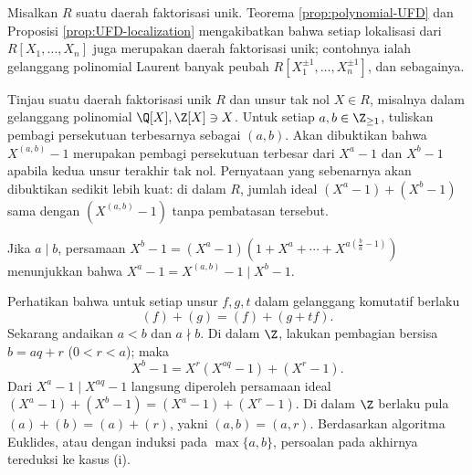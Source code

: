 \begin{example}
	Misalkan $R$ suatu daerah faktorisasi unik. Teorema \ref{prop:polynomial-UFD} dan Proposisi \ref{prop:UFD-localization} mengakibatkan bahwa setiap lokalisasi dari $R[X_1, \ldots, X_n]$ juga merupakan daerah faktorisasi unik; contohnya ialah gelanggang polinomial Laurent banyak peubah $R[X_1^{\pm 1}, \ldots, X_n^{\pm 1}]$, dan sebagainya.
\end{example}

\begin{example}\label{eg:gcd-cyclotomic}
	Tinjau suatu daerah faktorisasi unik $R$ dan unsur tak nol $X \in R$, misalnya dalam gelanggang polinomial $\Q[X], \Z[X] \ni X$. Untuk setiap $a, b \in \Z_{\geq 1}$, tuliskan pembagi persekutuan terbesarnya sebagai $(a,b)$. Akan dibuktikan bahwa $X^{(a,b)} - 1$ merupakan pembagi persekutuan terbesar dari $X^a - 1$ dan $X^b - 1$ apabila kedua unsur terakhir tak nol. Pernyataan yang sebenarnya akan dibuktikan sedikit lebih kuat: di dalam $R$, jumlah ideal $(X^a - 1) + (X^b - 1)$ sama dengan $\left( X^{(a,b)} - 1 \right)$ tanpa pembatasan tersebut.
	\begin{compactenum}[(i)]
		\item Jika $a \mid b$, persamaan $X^b - 1 = (X^a -1)(1 + X^a + \cdots + X^{a(\frac{b}{a} - 1)})$ menunjukkan bahwa $X^a - 1 = X^{(a,b)} - 1 \mid X^b - 1$.
		\item Perhatikan bahwa untuk setiap unsur $f, g, t$ dalam gelanggang komutatif berlaku
			\[ (f) + (g) = (f) + (g+tf). \]
			Sekarang andaikan $a < b$ dan $a \nmid b$. Di dalam $\Z$, lakukan pembagian bersisa $b = aq + r$ ($0 < r < a$); maka
			\[ X^b - 1 = X^r(X^{aq}-1) + (X^r - 1). \]
			Dari $X^a - 1 \mid X^{aq} - 1$ langsung diperoleh persamaan ideal $(X^a - 1) + (X^b - 1) = (X^a - 1) + (X^r - 1)$. Di dalam $\Z$ berlaku pula $(a) + (b) = (a) + (r)$, yakni $(a,b)=(a,r)$. Berdasarkan algoritma Euklides, atau dengan induksi pada $\max\{a,b\}$, persoalan pada akhirnya tereduksi ke kasus (i).
	\end{compactenum}
\end{example}

